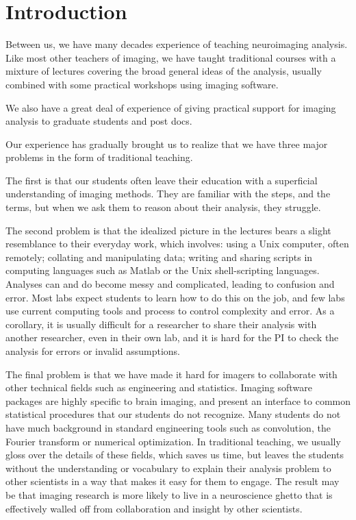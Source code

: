 \section{Introduction}

Between us, we have many decades experience of teaching neuroimaging analysis.
Like most other teachers of imaging, we have taught traditional courses with a
mixture of lectures covering the broad general ideas of the analysis, usually
combined with some practical workshops using imaging software.

We also have a great deal of experience of giving practical support for
imaging analysis to graduate students and post docs.

Our experience has gradually brought us to realize that we have three major
problems in the form of traditional teaching.

The first is that our students often leave their education with a superficial
understanding of imaging methods.  They are familiar with the steps, and the
terms, but when we ask them to reason about their analysis, they struggle.

The second problem is that the idealized picture in the lectures bears a
slight resemblance to their everyday work, which involves: using a Unix
computer, often remotely; collating and manipulating data; writing and sharing
scripts in computing languages such as Matlab or the Unix shell-scripting
languages.  Analyses can and do become messy and complicated, leading to
confusion and error.  Most labs expect students to learn how to do this on the
job, and few labs use current computing tools and process to control 
complexity and error.  As a corollary, it is usually difficult for a
researcher to share their analysis with another researcher, even in their own
lab, and it is hard for the PI to check the analysis for errors or invalid
assumptions.

The final problem is that we have made it hard for imagers to collaborate with
other technical fields such as engineering and statistics.  Imaging software
packages are highly specific to brain imaging, and present an interface to
common statistical procedures that our students do not recognize.  Many
students do not have much background in standard engineering tools such as
convolution, the Fourier transform or numerical optimization.  In traditional
teaching, we usually gloss over the details of these fields, which saves us
time, but leaves the students without the understanding or vocabulary to
explain their analysis problem to other scientists in a way that makes it easy
for them to engage.  The result may be that imaging research is more likely to
live in a neuroscience ghetto that is effectively walled off from
collaboration and insight by other scientists.


